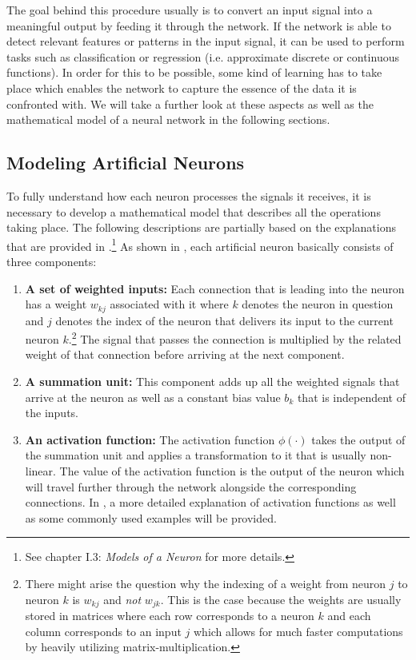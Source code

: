 The goal behind this procedure usually is to convert an input signal
into a meaningful output by feeding it through the network. If the
network is able to detect relevant features or patterns in the input
signal, it can be used to perform tasks such as classification or
regression (i.e. approximate discrete or continuous functions).
In order for this to be possible, some kind of learning has to take
place which enables the network to capture the essence of the data it
is confronted with. We will take a further look at these aspects as
well as the mathematical model of a neural network in the following
sections.

\subsection{Modeling Artificial Neurons}
\label{sec:artificial-neurons}
To fully understand how each neuron processes the signals it receives,
it is necessary to develop a mathematical model that describes all the
operations taking place. The following descriptions are partially
based on the explanations that are provided in \cite{Haykin}.\footnote{See
  chapter I.3: \textit{Models of a Neuron} for more details.}
As shown in , each artificial neuron
basically consists of three components:
\begin{enumerate}
  \item \textbf{A set of weighted inputs:} Each connection that is
    leading into the neuron has a weight \(w_{kj}\) associated with it
    where \(k\) denotes the neuron in question and \(j\) denotes the
    index of the neuron that delivers its input to the current neuron
    \(k\).\footnote{There might arise the question why the indexing of
    a weight from neuron \(j\) to neuron \(k\) is \(w_{kj}\) and
    \textit{not} \(w_{jk}\). This is the case because the weights are
    usually stored in matrices where each row corresponds to a
    neuron \(k\) and each column corresponds to an input \(j\) which
    allows for much faster computations by heavily utilizing
    matrix-multiplication.} The signal that
    passes the connection is multiplied by the
    related weight of that connection before arriving at the next
    component.
  \item \textbf{A summation unit:} This component adds up all the
    weighted signals that arrive at the neuron as well as a constant
    bias value
    \(b_k\) that is independent of the inputs.
  \item \textbf{An activation function:} The activation function
    \(\phi(\cdot)\) takes the output of the summation unit and applies
    a transformation to it that is usually non-linear. The value of
    the activation function is the output of the neuron which will
    travel further through the network alongside the corresponding
    connections. In , a more
    detailed explanation of activation functions as well as some
    commonly used examples will be provided.
\end{enumerate}
